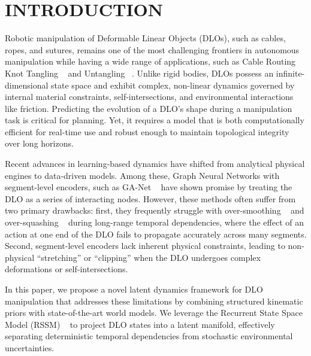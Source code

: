 \documentclass[letterpaper, 10 pt, conference]{ieeeconf}  %
\begin{document}
\section{INTRODUCTION}
\label{sec:intro}



Robotic manipulation of Deformable Linear Objects (DLOs), such as cables, ropes, and sutures, remains one of the most challenging frontiers in autonomous manipulation while having a wide range of applications, such as Cable Routing ~\cite{waltersson_planning_2022, wilson_cable_2023}  Knot Tangling ~\cite{sudry_hierarchical_2023} and Untangling ~\cite{grannen_untangling_2021, guler_towards_2025}. Unlike rigid bodies, DLOs possess an infinite-dimensional state space and exhibit complex, non-linear dynamics go\-verned by internal material constraints, self-intersections, and environmental interactions like friction. Predicting the evolution of a DLO's shape during a manipulation task is critical for planning. Yet, it requires a model that is both computationally efficient for real-time use and robust enough to maintain topological integrity over long horizons.

Recent advances in learning-based dynamics have shifted from analytical physical engines to data-driven models. Among these, Graph Neural Networks with segment-level encoders, such as GA-Net ~\cite{gu_learning_2025} have shown promise by treating the DLO as a series of interacting nodes. However, these methods often suffer from two primary drawbacks: first, they frequently struggle with over-smoothing ~\cite{oono_graph_2021} and over-squashing ~\cite{giovanni_how_2024, alon_bottleneck_2021} during long-range temporal dependencies, where the effect of an action at one end of the DLO fails to propagate accurately across many segments. Second, segment-level encoders lack inherent physical constraints, leading to non-physical ``stretching'' or ``clipping'' when the DLO undergoes complex deformations or self-intersections.

In this paper, we propose a novel latent dynamics framework for DLO manipulation that addresses these limitations by combining structured kinematic priors with state-of-the-art world models. We leverage the Recurrent State Space Model (RSSM) ~\cite{hafner_dream_2020} to project DLO states into a latent manifold, effectively separating deterministic temporal dependencies from stochastic environmental uncertainties.
\end{document}
